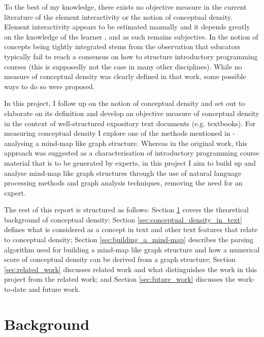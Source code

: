 \documentclass[12pt]{article}
\theoremstyle{grammarstyle}
\begin{document}
To the best of my knowledge, there exists no objective measure in the current literature of the element interactivity or the notion of conceptual density. Element interactivity appears to be estimated manually and it depends greatly on the knowledge of the learner \citep{chandler1996cognitive}, and as such remains subjective. In \citep{robins2010learning} the notion of concepts being tightly integrated stems from the observation that educators typically fail to reach a consensus on how to structure introductory programming courses (this is supposedly not the case in many other disciplines).  While no measure of conceptual density was clearly defined in that work, some possible ways to do so were proposed.

In this project, I follow up on the notion of conceptual density and set out to elaborate on its definition and develop an objective measure of conceptual density in the context of well-structured expository text documents (e.g. textbooks). For measuring conceptual density I explore one of the methods mentioned in \citep{robins2010learning} - analysing a mind-map like graph structure. Whereas in the original work, this approach was suggested as a characterisation of introductory programming course material that is to be generated by experts, in this project I aim to build up and analyse mind-map like graph structures through the use of natural language processing methods and graph analysis techniques, removing the need for an expert.

The rest of this report is structured as follows: Section \ref{sec:background} covers the theoretical background of conceptual density; Section \ref{sec:conceptual_density_in_text} defines what is considered as a concept in text and other text features that relate to conceptual density; Section \ref{sec:building_a_mind-map} describes the parsing algorithm used for building a mind-map like graph structure and how a numerical score of conceptual density can be derived from a graph structure; Section \ref{sec:related_work} discusses related work and what distinguishes the work in this project from the related work; and Section \ref{sec:future_work} discusses the work-to-date and future work.

\section{Background} \label{sec:background}
\end{document}

